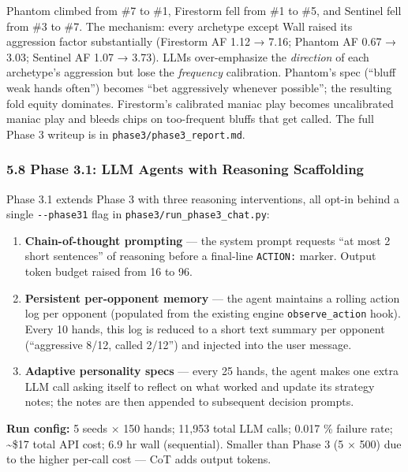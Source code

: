 \documentclass[
]{article}
\begin{document}
Phantom climbed from \#7 to \#1, Firestorm fell from \#1 to \#5, and
Sentinel fell from \#3 to \#7. The mechanism: every archetype except
Wall raised its aggression factor substantially (Firestorm AF 1.12 →
7.16; Phantom AF 0.67 → 3.03; Sentinel AF 1.07 → 3.73). LLMs
over-emphasize the \emph{direction} of each archetype's aggression but
lose the \emph{frequency} calibration. Phantom's spec (``bluff weak
hands often'') becomes ``bet aggressively whenever possible''; the
resulting fold equity dominates. Firestorm's calibrated maniac play
becomes uncalibrated maniac play and bleeds chips on too-frequent bluffs
that get called. The full Phase 3 writeup is in
\texttt{phase3/phase3\_report.md}.

\hypertarget{phase-3.1-llm-agents-with-reasoning-scaffolding}{%
\subsubsection{5.8 Phase 3.1: LLM Agents with Reasoning
Scaffolding}\label{phase-3.1-llm-agents-with-reasoning-scaffolding}}

Phase 3.1 extends Phase 3 with three reasoning interventions, all opt-in
behind a single \texttt{-\/-phase31} flag in
\texttt{phase3/run\_phase3\_chat.py}:

\begin{enumerate}
\def\labelenumi{\arabic{enumi}.}
\item
  \textbf{Chain-of-thought prompting} --- the system prompt requests
  ``at most 2 short sentences'' of reasoning before a final-line
  \texttt{ACTION:} marker. Output token budget raised from 16 to 96.
\item
  \textbf{Persistent per-opponent memory} --- the agent maintains a
  rolling action log per opponent (populated from the existing engine
  \texttt{observe\_action} hook). Every 10 hands, this log is reduced to
  a short text summary per opponent (``aggressive 8/12, called 2/12'')
  and injected into the user message.
\item
  \textbf{Adaptive personality specs} --- every 25 hands, the agent
  makes one extra LLM call asking itself to reflect on what worked and
  update its strategy notes; the notes are then appended to subsequent
  decision prompts.
\end{enumerate}

\textbf{Run config:} 5 seeds × 150 hands; 11,953 total LLM calls; 0.017
\% failure rate; \textasciitilde\$17 total API cost; 6.9 hr wall
(sequential). Smaller than Phase 3 (5 × 500) due to the higher per-call
cost --- CoT adds output tokens.
\end{document}
